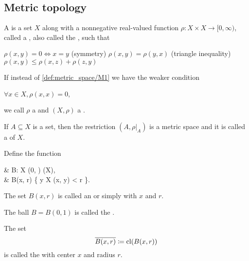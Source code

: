 \subsection{Metric topology}\label{subsec:metric_topology}

\begin{definition}\label{def:metric_space}
  A  is a set \( X \) along with a nonnegative real-valued function \( \rho: X \times X \to [0, \infty) \), called a , also called the , such that
  \begin{thmenum}[series=def:metric_space]
     \( \rho(x, y) = 0 \iff x = y \)
    (symmetry) \( \rho(x, y) = \rho(y, x) \)
    (triangle inequality) \( \rho(x, y) \leq \rho(x, z) + \rho(z, y) \)
  \end{thmenum}

  If instead of \ref{def:metric_space/M1} we have the weaker condition
  \begin{thmenum}[resume=def:metric_space]
     \( \forall x \in X, \rho(x, x) = 0 \),
  \end{thmenum}
  we call \( \rho \) a  and \( (X, \rho) \) a .

  \begin{thmenum}
     If \( A \subseteq X \) is a set, then the restriction \( (A, \rho{\rvert_A}) \) is a metric space and it is called a  of \( X \).

     Define the function
    \begin{balign*}
       & B: X \times (0, \infty) \to \pow(X),                   \\
       & B(x, r) \coloneqq \{ y \in X \colon \rho(x, y) < r \}.
    \end{balign*}

    The set \( B(x, r) \) is called an  or simply  with  \( x \) and  \( r \).

    The ball \( B = B(0, 1) \) is called the .

     The set
    \begin{equation*}
      \overline{B(x, r)} \coloneqq \operatorname{cl}(B(x, r))
    \end{equation*}
    is called the  with center \( x \) and radius \( r \).


\end{thmenum}
\end{definition}
